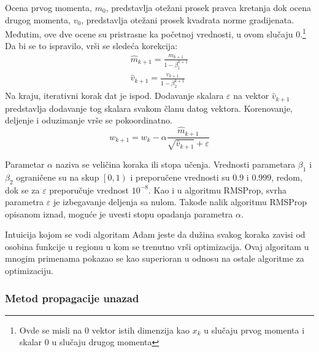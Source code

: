 Ocena prvog momenta, $m_0$, predstavlja otežani prosek pravca kretanja dok ocena drugog momenta, $v_0$, predstavlja otežani prosek kvadrata norme gradijenata. Međutim, ove dve ocene su pristrasne ka početnoj vrednosti, u ovom slučaju $0$.\footnote{Ovde se misli na $0$ vektor istih dimenzija kao $x_k$ u slučaju prvog momenta i skalar $0$ u slučaju drugog momenta} Da bi se to ispravilo, vrši se sledeća korekcija:
\begin{equation}
	\begin{gathered}
		\hat{m}_{k+1} = \frac{m_{k+1} }{1 - \beta_1^{k+1}} \\
		\hat{v}_{k+1} = \frac{v_{k+1} }{1 - \beta_2^{k+1}}
	\end{gathered}
\end{equation}
Na kraju, iterativni korak dat je ispod. Dodavanje skalara $\varepsilon$ na vektor $\hat{v}_{k+1}$ predstavlja dodavanje tog skalara svakom članu datog vektora. Korenovanje, deljenje i oduzimanje vrše se pokoordinatno.
\begin{equation}
	w_{k+1} = w_k - \alpha \frac{\hat{m}_{k+1}}{\sqrt{\hat{v}_{k+1}} + \varepsilon}
\end{equation}

Parametar $\alpha$ naziva se veličina koraka ili stopa učenja. Vrednosti parametara $\beta_1$ i $\beta_2$ ograničene su na skup $\left[0, 1\right) $ i preporučene vrednosti su $0.9$ i $0.999$, redom, dok se za $\varepsilon$ preporučuje vrednost $10^{-8}$. Kao i u algoritmu RMSProp, svrha parametra $\varepsilon$ je izbegavanje deljenja sa nulom. Takođe nalik algoritmu RMSProp opisanom iznad, moguće je uvesti stopu opadanja parametra $\alpha$.
\par
Intuicija kojom se vodi algoritam Adam jeste da dužina svakog koraka zavisi od osobina funkcije u regionu u kom se trenutno vrši optimizacija. Ovaj algoritam u mnogim primenama pokazao se kao superioran u odnosu na ostale algoritme za optimizaciju.



\subsubsection{Metod propagacije unazad}
\label{subsub:backprop}

